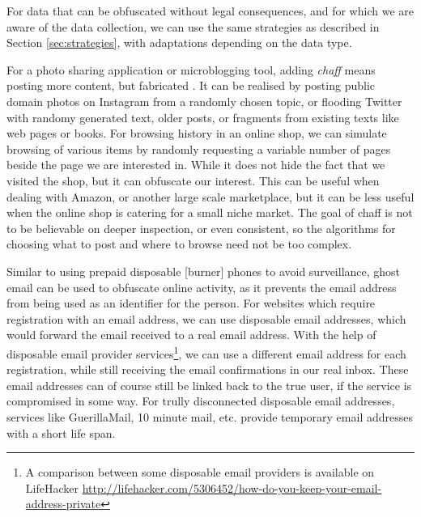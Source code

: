\documentclass{IOS-Book-Article}     %
\newcommand{\tbox}[3][red]{{
\color{#1}\noindent{
   \fbox{\scriptsize{ {\bf #2} \textsl{#3}}}
   \vspace{2pt}
}
}}
\newcommand{\todo}[1]{\tbox{TODO:}{#1}}
\begin{document}
For data that can be obfuscated without legal consequences, and for 
which we are aware of the data collection, we can use the same 
strategies as described in Section \ref{sec:strategies}, with adaptations 
depending on the data type. 

For a photo sharing application or microblogging tool, adding \emph{chaff} 
means posting more content, but fabricated \todo{the q is do we want to?}. It 
can be realised by posting public domain photos on Instagram from a randomly 
chosen topic, or flooding Twitter with randomy generated text, older posts, or 
fragments from existing texts like web pages or books. For browsing history in 
an online shop, we can simulate browsing of various items by randomly requesting 
a variable number of pages beside the page we are interested in. While it does 
not hide the fact that we visited the shop, but it can obfuscate our interest. 
This can be useful when dealing with Amazon, or another large scale marketplace, 
but it can be less useful when the online shop is catering for a small niche 
market. 
The goal of chaff is not to be believable on deeper inspection, or even 
consistent, so the algorithms for choosing what to post and where to browse 
need not be too complex. 

Similar to using prepaid disposable [burner] phones to avoid surveillance, 
ghost email can be used to obfuscate online activity, as it prevents the email 
address from being used as an identifier for the person. For websites which 
require registration with an email address, we can use disposable email 
addresses, which would forward the email received to a real email address. With 
the help of disposable email provider services\footnote{A comparison between 
some disposable email providers is available on LifeHacker 
\url{http://lifehacker.com/5306452/how-do-you-keep-your-email-address-private}}, 
we can use a different email address for each registration, while still 
receiving the email confirmations in our real inbox. These email addresses can 
of course still be linked back to the true user, if the service is compromised 
in some way. For trully disconnected disposable email addresses, services like 
GuerillaMail, 10 minute mail, etc. provide temporary email addresses with a 
short life span. 
\end{document}
